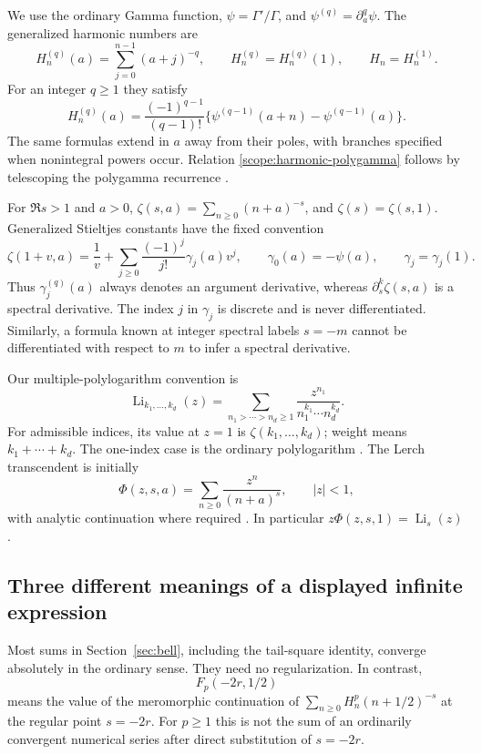 \documentclass[11pt,a4paper]{article}
\numberwithin{equation}{section}
\theoremstyle{definition}
\theoremstyle{remark}
\DeclareMathOperator{\Li}{Li}
\begin{document}
We use the ordinary Gamma function, $\psi=\Gamma'/\Gamma$, and
$\psi^{(q)}=\partial_a^q\psi$. The generalized harmonic numbers are
\[
 H_n^{(q)}(a)=\sum_{j=0}^{n-1}(a+j)^{-q},\qquad
 H_n^{(q)}=H_n^{(q)}(1),\qquad H_n=H_n^{(1)}.
\]
For an integer $q\ge1$ they satisfy
\begin{equation}\label{scope:harmonic-polygamma}
 H_n^{(q)}(a)=\frac{(-1)^{q-1}}{(q-1)!}
       \bigl\{\psi^{(q-1)}(a+n)-\psi^{(q-1)}(a)\bigr\}.
\end{equation}
The same formulas extend in $a$ away from their poles, with branches
specified when nonintegral powers occur. Relation
\eqref{scope:harmonic-polygamma} follows by telescoping the polygamma
recurrence \cite{DLMFPolygamma}.

For $\Re s>1$ and $a>0$,
$\zeta(s,a)=\sum_{n\ge0}(n+a)^{-s}$, and
$\zeta(s)=\zeta(s,1)$. Generalized Stieltjes constants have the
fixed convention
\begin{equation}\label{scope:Stieltjes}
 \zeta(1+v,a)=\frac1v+
       \sum_{j\ge0}\frac{(-1)^j}{j!}\gamma_j(a)v^j,
 \qquad \gamma_0(a)=-\psi(a),\qquad\gamma_j=\gamma_j(1).
\end{equation}
Thus $\gamma_j^{(q)}(a)$ always denotes an argument derivative,
whereas $\partial_s^k\zeta(s,a)$ is a spectral derivative.
The index $j$ in $\gamma_j$ is discrete and is never differentiated.
Similarly, a formula known at integer spectral labels $s=-m$ cannot
be differentiated with respect to $m$ to infer a spectral derivative.

Our multiple-polylogarithm convention is
\[
 \Li_{k_1,\ldots,k_d}(z)=
 \sum_{n_1>\cdots>n_d\ge1}
       \frac{z^{n_1}}{n_1^{k_1}\cdots n_d^{k_d}}.
\]
For admissible indices, its value at $z=1$ is
$\zeta(k_1,\ldots,k_d)$; weight means $k_1+\cdots+k_d$.
The one-index case is the ordinary polylogarithm
\cite{DLMFPolylog}. The Lerch transcendent is initially
\[
 \Phi(z,s,a)=\sum_{n\ge0}\frac{z^n}{(n+a)^s},\qquad |z|<1,
\]
with analytic continuation where required
\cite{DLMFLerch}. In particular $z\Phi(z,s,1)=\Li_s(z)$.

\subsection{Three different meanings of a displayed infinite expression}

Most sums in Section~\ref{sec:bell}, including the tail-square
identity, converge absolutely in the ordinary sense. They need no
regularization. In contrast,
\[
 F_p(-2r,1/2)
\]
means the value of the meromorphic continuation of
$\sum_{n\ge0}H_n^p(n+1/2)^{-s}$ at the regular point $s=-2r$.
For $p\ge1$ this is not the sum of an ordinarily convergent numerical
series after direct substitution of $s=-2r$.
\end{document}
